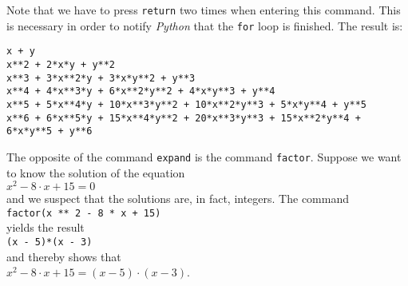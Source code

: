 \documentclass{article}
\begin{document}
Note that we have to press \texttt{return} two times when entering this command.  This is necessary
in order to notify \textsl{Python} that the \texttt{for} loop is finished.  The result is:
\begin{verbatim}
x + y
x**2 + 2*x*y + y**2
x**3 + 3*x**2*y + 3*x*y**2 + y**3
x**4 + 4*x**3*y + 6*x**2*y**2 + 4*x*y**3 + y**4
x**5 + 5*x**4*y + 10*x**3*y**2 + 10*x**2*y**3 + 5*x*y**4 + y**5
x**6 + 6*x**5*y + 15*x**4*y**2 + 20*x**3*y**3 + 15*x**2*y**4 + 6*x*y**5 + y**6
\end{verbatim}
The opposite of the command \texttt{expand} is the command \texttt{factor}.  Suppose we want to know
the solution of the equation
\\[0.2cm]
\hspace*{1.3cm}
$x^2 - 8 \cdot x + 15 = 0$
\\[0.2cm]
and we suspect that the solutions are, in fact, integers.  The command
\\[0.2cm]
\hspace*{1.3cm}
\texttt{factor(x ** 2 - 8 * x + 15)}
\\[0.2cm]
yields the result
\\[0.2cm]
\hspace*{1.3cm}
\texttt{(x - 5)*(x - 3)}
\\[0.2cm]
and thereby shows that
\\[0.2cm]
\hspace*{1.3cm}
$x^2 - 8 \cdot x + 15 = (x - 5) \cdot (x - 3)$.
\end{document}
